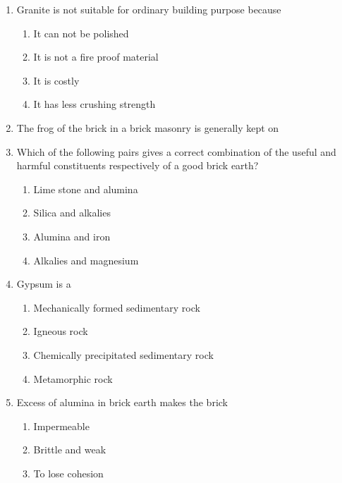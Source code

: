 \documentclass[11pt,a4paper]{article}
\begin{document}
\begin{enumerate}
\item{Granite is not suitable for ordinary building purpose because}
\begin{enumerate}[label=\Alph*.]
\item{It can not be polished}
\item{It is not a fire proof material}
\item{It is costly}
\item{It has less crushing strength}
\end{enumerate}
\item{The frog of the brick in a brick masonry is generally kept on}
\\
\item{Which of the following pairs gives a correct combination of the useful and harmful constituents respectively of a good brick earth?}
\begin{enumerate}[label=\Alph*.]
\item{Lime stone and alumina}
\item{Silica and alkalies}
\item{Alumina and iron}
\item{Alkalies and magnesium}
\end{enumerate}
\item{Gypsum is a}
\begin{enumerate}[label=\Alph*.]
\item{Mechanically formed sedimentary rock}
\item{Igneous rock}
\item{Chemically precipitated sedimentary rock}
\item{Metamorphic rock}
\end{enumerate}
\item{Excess of alumina in brick earth makes the brick}
\begin{enumerate}[label=\Alph*.]
\item{Impermeable}
\item{Brittle and weak}
\item{To lose cohesion}

\end{enumerate}
\end{enumerate}
\end{document}
